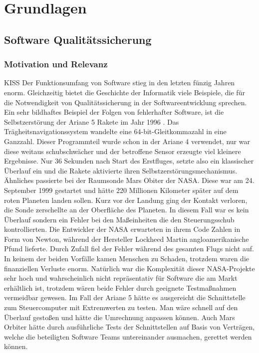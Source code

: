 \chapter{Grundlagen}
\label{sec:fundamentals}

\section{Software Qualitätssicherung}

\subsection{Motivation und Relevanz}

\gls{KISS}
Der Funktionsumfang von Software stieg in den letzten fünzig Jahren enorm. Gleichzeitig bietet die Geschichte der Informatik viele Beispiele, die für die Notwendigkeit von Qualitätssicherung in der Softwareentwicklung sprechen. Ein sehr bildhaftes Beispiel der Folgen von fehlerhafter Software, ist die Selbstzerstörung der Ariane 5 Rakete im Jahr 1996 \cite{giese_warum_2002}. Das Trägheitsnavigationssystem wandelte eine 64-bit-Gleitkommazahl in eine Ganzzahl. Dieser Programmteil wurde schon in der Ariane 4 verwendet, nur war diese weitaus schubschwächer und der betroffene Sensor erzeugte viel kleinere Ergebnisse. Nur 36 Sekunden nach Start des Erstfluges, setzte also ein klassischer Überlauf ein und die Rakete aktivierte ihren Selbstzerstörungsmechanismus.
Ähnliches passierte bei der Raumsonde Mars Obiter der NASA. Diese war am 24. September 1999 gestartet und hätte 220 Millionen Kilometer später auf dem roten Planeten landen sollen. Kurz vor der Landung ging der Kontakt verloren, die Sonde zerschellte an der Oberfläche des Planeten. In diesem Fall war es kein Überlauf sondern ein Fehler bei den Maßeinheiten die den Steuerungsschub kontrollierten. Die Entwickler der NASA erwarteten in ihrem Code Zahlen in Form von Newton, während der Hersteller Lockheed Martin angloamerikanische Pfund lieferte. Durch Zufall fiel der Fehler während des gesamten Flugs nicht auf. \cite{thaller_software-test:_2002}
In keinem der beiden Vorfälle kamen Menschen zu Schaden, trotzdem waren die finanziellen Verluste enorm. Natürlich war die Komplexität dieser NASA-Projekte sehr hoch und wahrscheinlich nicht repräsentativ für Software die am Markt erhältlich ist, trotzdem wären beide Fehler durch geeignete Testmaßnahmen vermeidbar gewesen. Im Fall der Ariane 5 hätte es ausgereicht die Schnittstelle zum Steuercomputer mit Extremwerten zu testen. Man wäre schnell auf den Überlauf gestoßen und hätte die Umrechnung anpassen können. Auch Mars Orbiter hätte durch ausführliche Tests der Schnittstellen auf Basis von Verträgen, welche die beteiligten Software Teams untereinander ausmachen, gerettet werden können.

